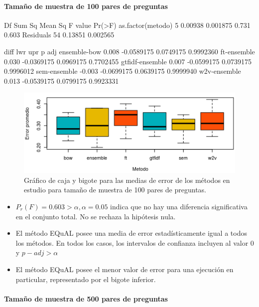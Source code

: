 \paragraph{Tamaño de muestra de 100 pares de preguntas}

\begin{rc}
                 Df  Sum Sq  Mean Sq F value Pr(>F)
as.factor(metodo)  5 0.00938 0.001875   0.731  0.603
Residuals         54 0.13851 0.002565
\end{rc}

\begin{rc}
                 diff        lwr       upr     p adj
ensemble-bow     0.008 -0.0589175 0.0749175 0.9992360
ft-ensemble      0.030 -0.0369175 0.0969175 0.7702455
gtfidf-ensemble  0.007 -0.0599175 0.0739175 0.9996012
sem-ensemble    -0.003 -0.0699175 0.0639175 0.9999940
w2v-ensemble     0.013 -0.0539175 0.0799175 0.9923331
\end{rc}

\begin{figure}
	\centering
	\includegraphics[width=0.7\linewidth]{10_resultados/imagenes/anova_100}
	\caption{Gráfico de caja y bigote para las medias de error de los métodos en estudio para tamaño de muestra de 100 pares de preguntas.}
	\label{fig:anova100}
\end{figure}

\begin{itemize}
	\item \(P_r(F) = 0.603 > \alpha, \alpha = 0.05\) indica que no hay una diferencia significativa en el conjunto total. No se rechaza la hipótesis nula.
	\item El método EQuAL posee una media de error estadísticamente igual a todos los métodos. En todos los casos, los intervalos de confianza incluyen al valor 0 y \(p-adj > \alpha\)
	\item El método EQuAL posee el menor valor de error para una ejecución en particular, representado por el bigote inferior.
\end{itemize}

\paragraph{Tamaño de muestra de 500 pares de preguntas}

